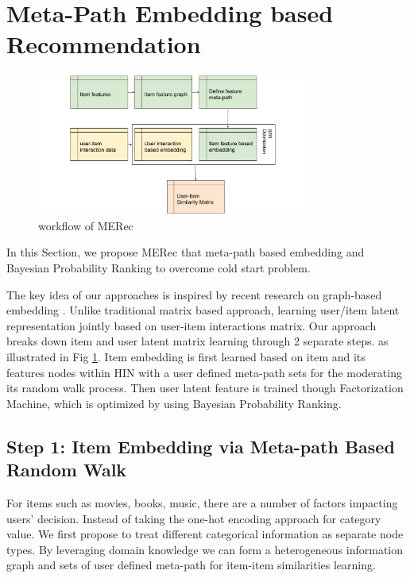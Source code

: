 \section{Meta-Path Embedding based Recommendation}

\begin{figure}[!t]
    \centering
    \includegraphics[width=0.8\textwidth]{figs/fig0.png}
    \caption{workflow of MERec}\label{fig:fe-overview}
\end{figure}

In this Section, we propose MERec that meta-path based embedding and Bayesian Probability Ranking to overcome cold start problem. 

The key idea of our approaches is inspired by recent research on graph-based embedding \cite{dong2017metapath2vec}. Unlike traditional matrix based approach, learning user/item latent representation jointly based on user-item interactions matrix. Our approach breaks down item and user latent matrix learning through 2 separate steps. as illustrated in Fig \ref{fig:fe-overview}. Item embedding is first learned based on item and its features nodes within HIN with a user defined meta-path sets for the moderating its random walk process. Then user latent feature is trained though Factorization Machine, which is optimized by using Bayesian Probability Ranking.

\subsection{Step 1: Item Embedding via Meta-path Based Random Walk}\label{3MF}

For items such as movies, books, music, there are a number of factors impacting users' decision. Instead of taking the one-hot encoding approach for category value. We first propose to treat different categorical information as separate node types. 
By leveraging domain knowledge we can form a heterogeneous information graph and sets of user defined meta-path for item-item similarities learning. 

